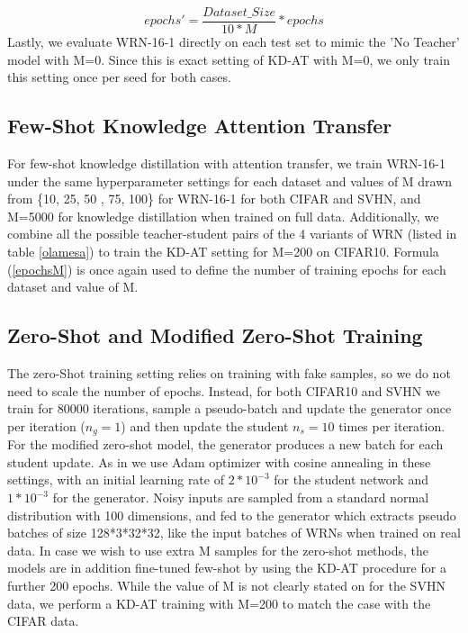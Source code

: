 \useshortskip
\begin{equation}
    epochs'= \frac{Dataset\_Size}{10*M} * epochs
    \label{epochsM}
\end{equation}
\useshortskip
Lastly, we evaluate WRN-16-1 directly on each test set to mimic the 'No Teacher' model with M=0. Since this is exact setting of KD-AT with M=0, we only train this setting once per seed for both cases. 

\subsection{Few-Shot Knowledge Attention Transfer}

For few-shot knowledge distillation with attention transfer, we train WRN-16-1 under the same hyperparameter settings for each dataset and values of M drawn from \{10, 25, 50 , 75, 100\} for WRN-16-1 for both CIFAR and SVHN, and M=5000 for knowledge distillation when trained on full data. Additionally, we combine all the possible teacher-student pairs of the 4 variants of WRN (listed in table \ref{olamesa}) to train the KD-AT setting for M=200 on CIFAR10. Formula (\ref{epochsM}) is once again used to define the number of training epochs for each dataset and value of M. 

\subsection{Zero-Shot and Modified Zero-Shot Training}

The zero-Shot training setting relies on training with fake samples, so we do not need to scale the number of epochs. Instead, for both CIFAR10 and SVHN we train for 80000 iterations, sample a pseudo-batch and update the generator once per iteration ($n_g=1$) and then update the student $n_s=10$ times per iteration. For the modified zero-shot model, the generator produces a new batch for each student update. As in \cite{Micaelli2019ZeroShotKT} we use Adam optimizer\cite{adam} with cosine annealing\cite{cosinelr} in these settings, with an initial learning rate of $2*10^{-3}$ for the student network and $1*10^{-3}$ for the generator. Noisy inputs are sampled from a standard normal distribution with 100 dimensions, and fed to the generator which extracts pseudo batches of size 128*3*32*32, like the input batches of WRNs when trained on real data. In case we wish to use extra M samples for the zero-shot methods, the models are in addition fine-tuned few-shot by using the KD-AT procedure for a further 200 epochs. While the value of M is not clearly stated on \cite{Micaelli2019ZeroShotKT} for the SVHN data, we perform a KD-AT training with M=200 to match the case with the CIFAR data. 

